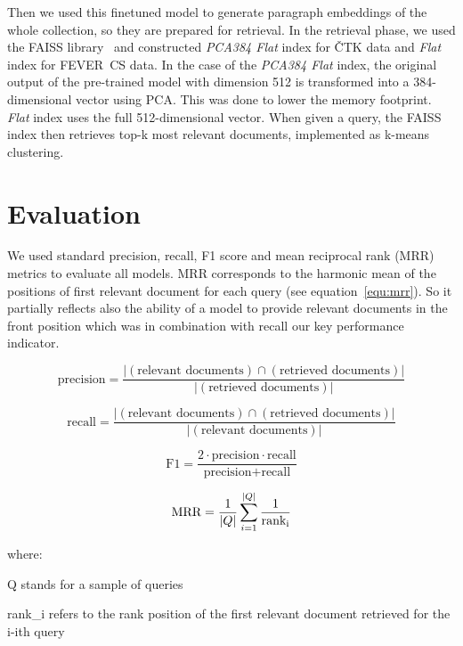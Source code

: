     Then we used this finetuned model to generate paragraph embeddings of the whole collection, so they are prepared for retrieval. In the retrieval phase, we used the FAISS library~\parencite{Johnson_2019_faiss} and constructed \emph{PCA384 Flat} index for ČTK data and \emph{Flat} index for FEVER~CS data. In the case of the \emph{PCA384 Flat} index, the original output of the pre-trained model with dimension 512 is transformed into a 384-dimensional vector using PCA. This was done to lower the memory footprint. \emph{Flat} index uses the full 512-dimensional vector. When given a query, the FAISS index then retrieves top-k most relevant documents, implemented as k-means clustering.


\section{Evaluation}
\label{section:evaluation}
    We used standard precision, recall, F1 score and mean reciprocal rank (MRR) metrics to evaluate all models. MRR corresponds to the harmonic mean of the positions of first relevant document for each query (see equation~\ref{equ:mrr}). So it partially reflects also the ability of a model to provide relevant documents in the front position which was in combination with recall our key performance indicator.
    
    \begin{equation} \label{equ:recall}
        \text{precision} = \frac{|(\text{relevant documents}) \cap (\text{retrieved documents})|}{|(\text{retrieved documents})|}
    \end{equation}
    
    \begin{equation} \label{equ:precision}
        \text{recall} = \frac{|(\text{relevant documents}) \cap (\text{retrieved documents})|}{|(\text{relevant documents})|}
    \end{equation}
    
    \begin{equation} \label{equ:f1}
        \text{F1} = \frac{2 \cdot \text{precision} \cdot \text{recall}}{ \text{precision} + \text{recall}}
    \end{equation}
    
    \begin{equation} \label{equ:mrr}
        \text{MRR} = \frac{1}{|Q|} \sum_{i=1}^{|Q|} \frac{1}{\text{rank\textsubscript{i}}}
    \end{equation}
    
    where:
    \begin{where}
        \item [Q] stands for a sample of queries
        \item [rank_{i}] refers to the rank position of the first relevant document retrieved for the i-ith query
    \end{where}
    
